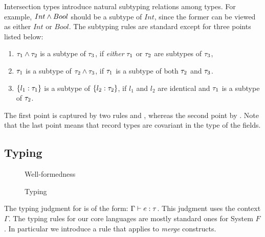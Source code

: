 Intersection types introduce natural subtyping relations among types. For
example, $ Int \wedge Bool $ should be a subtype of $ Int $, since the
former can be viewed as either $ Int $ or $ Bool $. The subtyping rules are
standard except for three points listed below:
\begin{enumerate}
\item $ \tau_1 \wedge \tau_2 $ is a subtype of $ \tau_3 $, if \emph{either} $ \tau_1 $ or
  $ \tau_2 $ are subtypes of $ \tau_3 $,

\item $ \tau_1 $ is a subtype of $ \tau_2 \wedge \tau_3 $, if $ \tau_1 $ is a subtype of
  both $ \tau_2 $ and $ \tau_3 $.

\item $ \{ l_1 : \tau_1 \} $ is a subtype of $ \{ l_2 : \tau_2 \} $, if
  $ l_1 $ and $ l_2 $ are identical and $ \tau_1 $ is a subtype of $ \tau_2 $.
\end{enumerate}
The first point is captured by two rules  and ,
whereas the second point by . Note that the last point means
that record types are covariant in the type of the fields.

\subsection{Typing}

\begin{figure}

\caption{Well-formedness}
\end{figure}

\begin{figure}



\caption{Typing}
\end{figure}

The typing judgment for \name is of the form: $ \Gamma \vdash e : \tau $. This
judgment uses the context $ \Gamma $. The typing rules for our core languages
are mostly standard ones for System $ F $. 
In particular we introduce a
 rule that applies to \emph{merge}
constructs.

